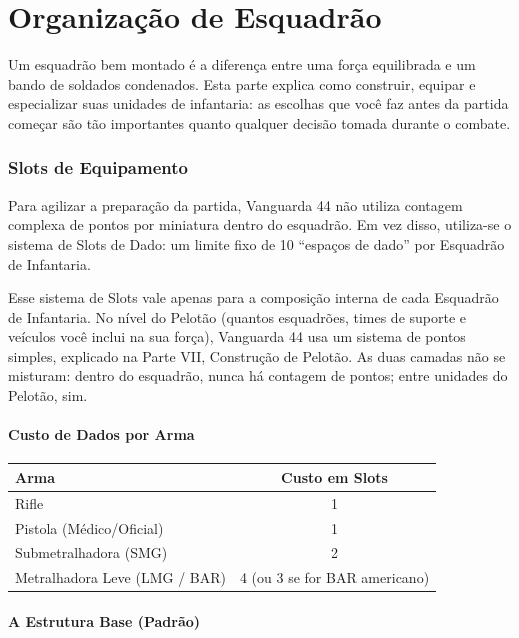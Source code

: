 \part{Organização de Esquadrão}

Um esquadrão bem montado é a diferença entre uma força equilibrada e um bando de soldados condenados. Esta parte explica como construir, equipar e especializar suas unidades de infantaria: as escolhas que você faz antes da partida começar são tão importantes quanto qualquer decisão tomada durante o combate.

\section{Slots de Equipamento}

Para agilizar a preparação da partida, Vanguarda 44 não utiliza contagem complexa de pontos por miniatura dentro do esquadrão. Em vez disso, utiliza-se o sistema de Slots de Dado: um limite fixo de 10 ``espaços de dado'' por Esquadrão de Infantaria.

Esse sistema de Slots vale apenas para a composição interna de cada Esquadrão de Infantaria. No nível do Pelotão (quantos esquadrões, times de suporte e veículos você inclui na sua força), Vanguarda 44 usa um sistema de pontos simples, explicado na Parte VII, Construção de Pelotão. As duas camadas não se misturam: dentro do esquadrão, nunca há contagem de pontos; entre unidades do Pelotão, sim.

\subsection{Custo de Dados por Arma}

\begin{center}
\begin{tabular}{lc}
\toprule
Arma & Custo em Slots \\
\midrule
Rifle & 1 \\
Pistola (Médico/Oficial) & 1 \\
Submetralhadora (SMG) & 2 \\
Metralhadora Leve (LMG / BAR) & 4 (ou 3 se for BAR americano) \\
\bottomrule
\end{tabular}
\end{center}

\subsection{A Estrutura Base (Padrão)}

